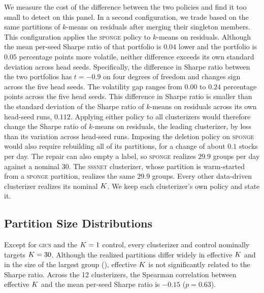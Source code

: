 We measure the cost of the difference between the two policies and find it too small to detect on this panel. In a second configuration, we trade based on the same partitions of $k$-means on residuals after merging their singleton members. This configuration applies the \textsc{sponge} policy to $k$-means on residuals. Although the mean per-seed Sharpe ratio of that portfolio is $0.04$ lower and the portfolio is $0.05$ percentage points more volatile, neither difference exceeds its own standard deviation across head seeds. Specifically, the difference in Sharpe ratio between the two portfolios has $t=-0.9$ on four degrees of freedom and changes sign across the five head seeds. The volatility gap ranges from $0.00$ to $0.24$ percentage points across the five head seeds.
This difference in Sharpe ratio is smaller than the standard deviation of the Sharpe ratio of $k$-means on residuals across its own head-seed runs, $0.112$. Applying either policy to all clusterizers would therefore change the Sharpe ratio of $k$-means on residuals, the leading clusterizer, by less than its variation across head-seed runs. Imposing the deletion policy on \textsc{sponge} would also require rebuilding all of its partitions, for a change of about $0.1$ stocks per day. The repair can also empty a label, so \textsc{sponge} realizes $29.9$ groups per day against a nominal $30$. The \textsc{sssnet} clusterizer, whose partition is warm-started from a \textsc{sponge} partition, realizes the same $29.9$ groups. Every other data-driven clusterizer realizes its nominal $K$. We keep each clusterizer's own policy and state it.

\subsection{Partition Size Distributions}
\label{app:sizes}

Except for \textsc{gics} and the $K=1$ control, every clusterizer and control nominally targets
$K = 30$. Although the realized partitions differ widely in effective $K$ and in the size of the largest group (), effective $K$ is not significantly related to the Sharpe ratio. Across the 12
clusterizers, the Spearman correlation between effective $K$ and the mean per-seed Sharpe ratio is $-0.15$ ($p = 0.63$).

